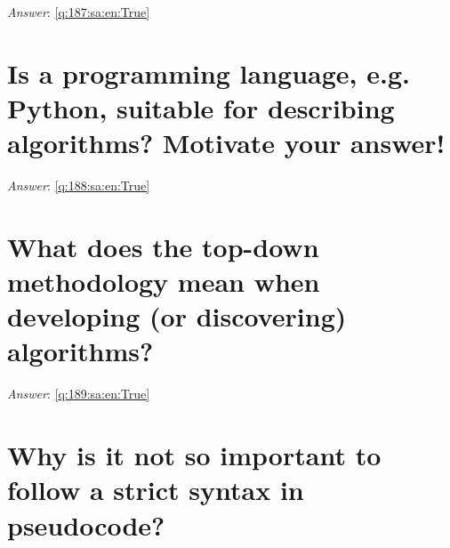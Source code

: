 \documentclass[a4paper,11pt,oneside]{book}
\begin{document}
\begin{sloppypar}
\label{q:187:sa:en:False}

\vspace{2cm}

\noindent\makebox[\textwidth]{\hrulefill}

\vspace{1cm}

\textit{Answer}: \autoref{q:187:sa:en:True}



\section{Is a programming language, e.g. Python, suitable for describing algorithms? Motivate your answer!}

\label{q:188:sa:en:False}

\vspace{2cm}

\noindent\makebox[\textwidth]{\hrulefill}

\vspace{1cm}

\textit{Answer}: \autoref{q:188:sa:en:True}



\section{What does the top-down methodology mean when developing (or discovering) algorithms?}

\label{q:189:sa:en:False}

\vspace{2cm}

\noindent\makebox[\textwidth]{\hrulefill}

\vspace{1cm}

\textit{Answer}: \autoref{q:189:sa:en:True}



\section{Why is it not so important to follow a strict syntax in pseudocode?}

\label{q:190:sa:en:False}

\vspace{2cm}

\noindent\makebox[\textwidth]{\hrulefill}

\vspace{1cm}


\end{sloppypar}
\end{document}
